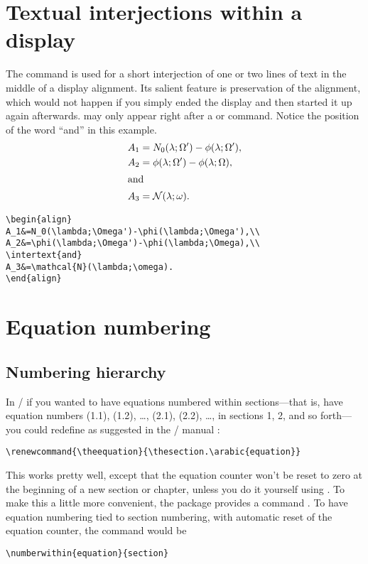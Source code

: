 \documentclass[leqno,titlepage,openany]{amsldoc}
\begin{document}
\section{Textual interjections within a display}

The command  is used for a short interjection of one or
two lines of text in the middle of a
display alignment. Its salient feature is preservation of the alignment,
which would not happen if you simply ended the display and then started
it up again afterwards.  may only appear right after a
\cn{\\} or \cn{\\*} command. Notice the position of the word ``and'' in
this example.
\begin{align}
A_1&=N_0(\lambda;\Omega')-\phi(\lambda;\Omega'),\\
A_2&=\phi(\lambda;\Omega')-\phi(\lambda;\Omega),\\
\intertext{and}
A_3&=\mathcal{N}(\lambda;\omega).
\end{align}
\begin{verbatim}
\begin{align}
A_1&=N_0(\lambda;\Omega')-\phi(\lambda;\Omega'),\\
A_2&=\phi(\lambda;\Omega')-\phi(\lambda;\Omega),\\
\intertext{and}
A_3&=\mathcal{N}(\lambda;\omega).
\end{align}
\end{verbatim}

\section{Equation numbering}

\subsection{Numbering hierarchy}
In \latex/ if you wanted to have equations numbered within
sections---that is, have
equation numbers (1.1), (1.2), \dots, (2.1), (2.2),
\dots, in sections 1, 2, and so forth---you could redefine
 as suggested in the \latex/ manual \cite[\S6.3, \S C.8.4]{lm}:
\begin{verbatim}
\renewcommand{\theequation}{\thesection.\arabic{equation}}
\end{verbatim}

This works pretty well, except that the equation counter won't be reset
to zero at the beginning of a new section or chapter, unless you do it
yourself using . To make this a little more convenient,
the  package provides a command . To have equation numbering tied to
section numbering, with automatic reset of the equation counter, the
command would be
\begin{verbatim}
\numberwithin{equation}{section}
\end{verbatim}
\end{document}
